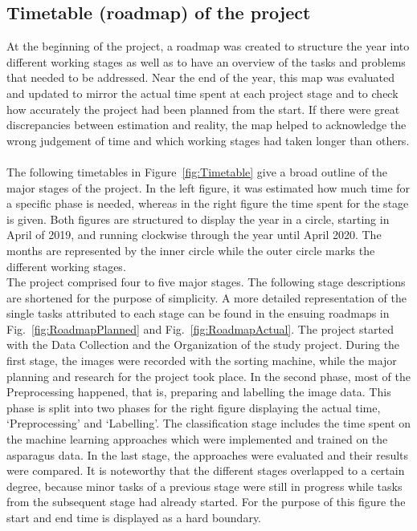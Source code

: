 \subsection{Timetable (roadmap) of the project}

At the beginning of the project, a roadmap was created to structure the year into different working stages as well as to have an overview of the tasks and problems that needed to be addressed. Near the end of the year, this map was evaluated and updated to mirror the actual time spent at each project stage and to check how accurately the project had been planned from the start. If there were great discrepancies between estimation and reality, the map helped to acknowledge the wrong judgement of time and which working stages had taken longer than others. \\
\\
The following timetables in Figure~\ref{fig:Timetable} give a broad outline of the major stages of the project. In the left figure, it was estimated how much time for a specific phase is needed, whereas in the right figure the time spent for the stage is given. Both figures are structured to display the year in a circle, starting in April of 2019, and running clockwise through the year until April 2020. The months are represented by the inner circle while the outer circle marks the different working stages. \\
The project comprised four to five major stages. The following stage descriptions are shortened for the purpose of simplicity. A more detailed representation of the single tasks attributed to each stage can be found in the ensuing roadmaps in Fig.~\ref{fig:RoadmapPlanned} and Fig.~\ref{fig:RoadmapActual}. The project started with the Data Collection and the Organization of the study project. During the first stage, the images were recorded with the sorting machine, while the major planning and research for the project took place. In the second phase, most of the Preprocessing happened, that is, preparing and labelling the image data. This phase is split into two phases for the right figure displaying the actual time, ‘Preprocessing’ and ‘Labelling’. The classification stage includes the time spent on the machine learning approaches which were implemented and trained on the asparagus data. In the last stage, the approaches were evaluated and their results were compared. It is noteworthy that the different stages overlapped to a certain degree, because minor tasks of a previous stage were still in progress while tasks from the subsequent stage had already started. For the purpose of this figure the start and end time is displayed as a hard boundary. \\
\\


